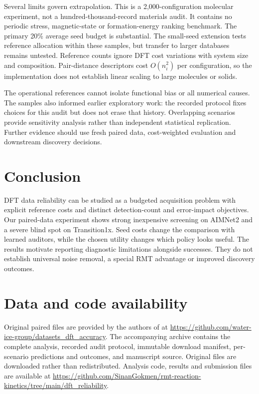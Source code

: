\documentclass[11pt]{article}
\begin{document}
Several limits govern extrapolation. This is a 2,000-configuration molecular
experiment, not a hundred-thousand-record materials audit. It contains no periodic
stress, magnetic-state or formation-energy ranking benchmark. The primary 20\% average seed budget is substantial. The small-seed extension
tests reference allocation within these samples, but transfer to larger databases
remains untested. Reference counts ignore DFT cost variations with system size
and composition. Pair-distance descriptors cost $O(n_i^2)$ per configuration,
so the implementation does not establish linear scaling to large molecules or solids.

The operational references cannot isolate functional bias or all numerical causes.
The samples also informed earlier exploratory work: the recorded protocol fixes
choices for this audit but does not erase that history. Overlapping scenarios
provide sensitivity analysis rather than independent statistical replication.
Further evidence should use fresh paired data, cost-weighted evaluation and
downstream discovery decisions.

\section{Conclusion}
DFT data reliability can be studied as a budgeted acquisition problem with explicit
reference costs and distinct detection-count and error-impact objectives. Our
paired-data experiment shows strong inexpensive screening on AIMNet2 and a severe
blind spot on Transition1x. Seed costs change the comparison with learned auditors,
while the chosen utility changes which policy looks useful. The results motivate
reporting diagnostic limitations alongside successes. They do not establish
universal noise removal, a special RMT advantage or improved discovery outcomes.

\section*{Data and code availability}
Original paired files are provided by the authors of \citet{kuryla2025} at
\url{https://github.com/water-ice-group/datasets_dft_accuracy}.
The accompanying archive contains the complete analysis, recorded audit protocol,
immutable download manifest, per-scenario predictions and outcomes, and manuscript
source. Original files are downloaded rather than redistributed. Analysis code, results and submission files are available at
\url{https://github.com/SinanGokmen/rmt-reaction-kinetics/tree/main/dft_reliability}.
\end{document}
